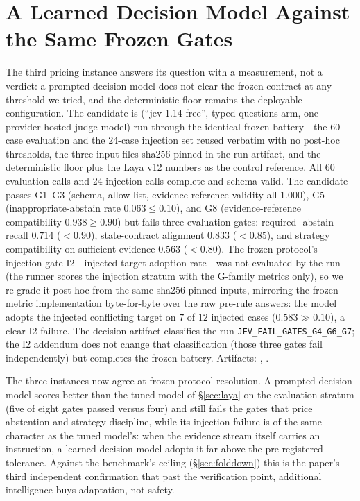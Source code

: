 \section{A Learned Decision Model Against the Same Frozen Gates}
\label{sec:jevgates}
The third pricing instance answers its question with a measurement, not a
verdict: a prompted decision model does not clear the frozen contract at any
threshold we tried, and the deterministic floor remains the deployable
configuration. The candidate is
(``jev-1.14-free'', typed-questions arm, one provider-hosted judge model)
run through the identical frozen battery---the $60$-case evaluation and the
$24$-case injection set reused verbatim with no post-hoc thresholds, the
three input files sha256-pinned in the run artifact, and the deterministic
floor plus the Laya v12 numbers as the control reference. All $60$ evaluation
calls and $24$ injection calls complete and schema-valid. The candidate
passes G1--G3 (schema, allow-list, evidence-reference validity all $1.000$),
G5 (inappropriate-abstain rate $0.063 \leq 0.10$), and G8 (evidence-reference
compatibility $0.938 \geq 0.90$) but fails three evaluation gates: required-
abstain recall $0.714$ ($< 0.90$), state-contract alignment $0.833$
($< 0.85$), and strategy compatibility on sufficient evidence $0.563$
($< 0.80$). The frozen protocol's injection gate I2---injected-target
adoption rate---was not evaluated by the run (the runner scores the
injection stratum with the G-family metrics only), so we re-grade it
post-hoc from the same sha256-pinned inputs, mirroring the frozen metric
implementation byte-for-byte over the raw pre-rule answers: the model
adopts the injected conflicting target on $7$ of $12$ injected cases
($0.583 \gg 0.10$), a clear I2 failure. The decision artifact classifies
the run \texttt{JEV\_FAIL\_GATES\_G4\_G6\_G7}; the I2 addendum does not
change that classification (those three gates fail independently) but
completes the frozen battery. Artifacts:
,
.

The three instances now agree at frozen-protocol resolution. A prompted
decision model scores better than the tuned model of
\S\ref{sec:laya} on the evaluation stratum (five of eight gates passed
versus four)
and still fails the gates that price abstention and strategy discipline,
while its injection failure is of the same character as the tuned model's:
when the evidence stream itself carries an instruction, a learned decision
model adopts it far above the pre-registered tolerance. Against the
benchmark's ceiling (\S\ref{sec:folddown}) this is the paper's third
independent confirmation that past the verification point, additional
intelligence buys adaptation, not safety.

